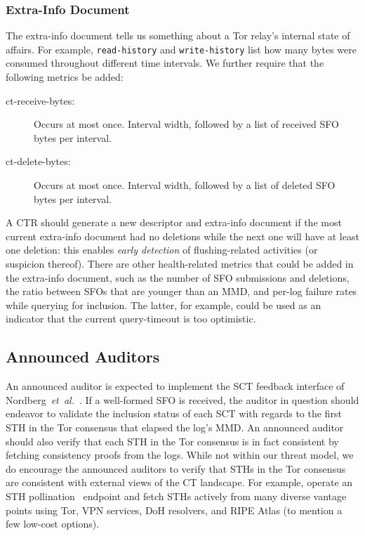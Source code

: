 \subsubsection{Extra-Info Document}
The extra-info document tells us something about a Tor relay's internal state of
affairs.  For example, \texttt{read-history} and \texttt{write-history} list how
many bytes were consumed throughout different time intervals.  We further
require that the following metrics be added:
\begin{description}
	\item[ct-receive-bytes:] Occurs at most once.  Interval width, followed by a
		list of received SFO bytes per interval.
	\item[ct-delete-bytes:] Occurs at most once.  Interval width, followed by a
		list of deleted SFO bytes per interval.
\end{description}

A CTR should generate a new descriptor and extra-info document if the most
current extra-info document had no deletions while the next one will have at
least one deletion:
	this enables \emph{early detection} of flushing-related activities
	(or suspicion thereof).
There are other health-related metrics that could be added in the
extra-info document, such as
	the number of SFO submissions and deletions,
	the ratio between SFOs that are younger than an MMD, and
	per-log failure rates while querying for inclusion.
The latter, for example, could be used as an indicator that the current
query-timeout is too optimistic.

\subsection{Announced Auditors}
An announced auditor is expected to implement the SCT feedback interface of
Nordberg~\emph{et~al.}~\cite{nordberg}.  If a well-formed SFO is received, the
auditor in question should endeavor to validate the inclusion status of each SCT
with regards to the first STH in the Tor consensus that elapsed the log's MMD.
An announced auditor should also verify that each STH in the Tor consensus is
in fact consistent by fetching consistency proofs from the logs.
While not within our threat model, we do encourage the announced auditors to
verify that STHs in the Tor consensus are consistent with external views of the
CT landscape.  For example, operate an STH pollination~\cite{nordberg} endpoint
and fetch STHs actively from many diverse vantage points using Tor, VPN
services, DoH resolvers, and RIPE Atlas (to mention a few low-cost options).

